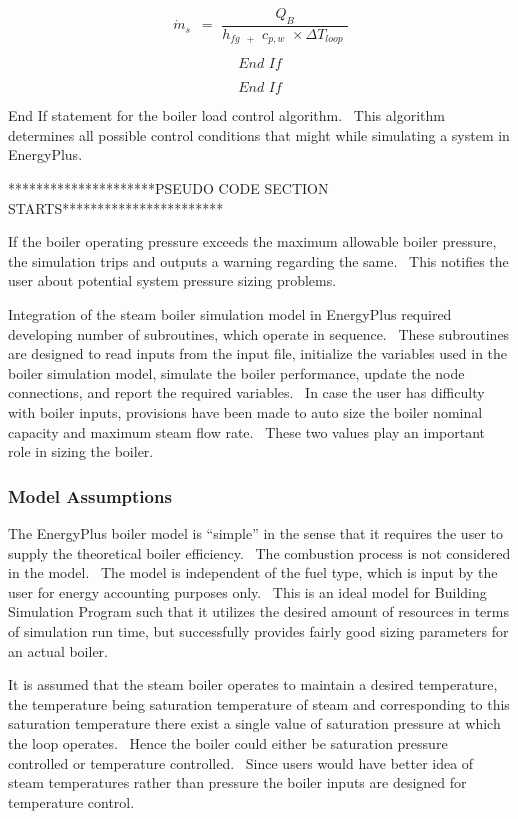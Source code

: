 \begin{equation}
\,{\dot m_s}\,\,\, = \,\,\frac{{{Q_B}}}{{{h_{fg\,\,\, + }}\,\,{c_{p,w}}\,\, \times \Delta {T_{loop}}\,\,}}
\end{equation}

\begin{equation}
End\,\,If
\end{equation}

\begin{equation}
End\,\,If
\end{equation}

End If statement for the boiler load control algorithm.~ This algorithm determines all possible control conditions that might while simulating a system in EnergyPlus.

*********************PSEUDO CODE SECTION STARTS***********************

If the boiler operating pressure exceeds the maximum allowable boiler pressure, the simulation trips and outputs a warning regarding the same.~ This notifies the user about potential system pressure sizing problems.

Integration of the steam boiler simulation model in EnergyPlus required developing number of subroutines, which operate in sequence.~ These subroutines are designed to read inputs from the input file, initialize the variables used in the boiler simulation model, simulate the boiler performance, update the node connections, and report the required variables.~ In case the user has difficulty with boiler inputs, provisions have been made to auto size the boiler nominal capacity and maximum steam flow rate.~ These two values play an important role in sizing the boiler.

\subsubsection{Model Assumptions}\label{model-assumptions}

The EnergyPlus boiler model is ``simple'' in the sense that it requires the user to supply the theoretical boiler efficiency.~ The combustion process is not considered in the model.~ The model is independent of the fuel type, which is input by the user for energy accounting purposes only.~ This is an ideal model for Building Simulation Program such that it utilizes the desired amount of resources in terms of simulation run time, but successfully provides fairly good sizing parameters for an actual boiler.

It is assumed that the steam boiler operates to maintain a desired temperature, the temperature being saturation temperature of steam and corresponding to this saturation temperature there exist a single value of saturation pressure at which the loop operates.~ Hence the boiler could either be saturation pressure controlled or temperature controlled.~ Since users would have better idea of steam temperatures rather than pressure the boiler inputs are designed for temperature control.

